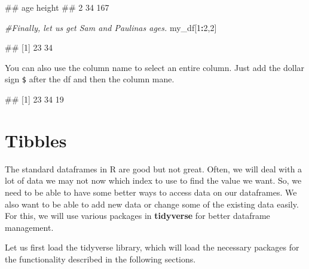 \documentclass[
]{book}
\newenvironment{Shaded}{\begin{snugshade}}{\end{snugshade}}
\newcommand{\CommentTok}[1]{\textcolor[rgb]{0.56,0.35,0.01}{\textit{#1}}}
\newcommand{\DecValTok}[1]{\textcolor[rgb]{0.00,0.00,0.81}{#1}}
\newcommand{\NormalTok}[1]{#1}
\newcommand{\SpecialCharTok}[1]{\textcolor[rgb]{0.81,0.36,0.00}{\textbf{#1}}}
\begin{document}
\begin{Shaded}
\begin{Highlighting}[]
\NormalTok{\#\#   age height}
\NormalTok{\#\# 2  34    167}
\end{Highlighting}
\end{Shaded}

\begin{Shaded}
\begin{Highlighting}[]
\CommentTok{\#Finally, let us get Sam and Paulina\textquotesingle{}s ages.}
\NormalTok{my\_df[}\DecValTok{1}\SpecialCharTok{:}\DecValTok{2}\NormalTok{,}\DecValTok{2}\NormalTok{]}
\end{Highlighting}
\end{Shaded}

\begin{Shaded}
\begin{Highlighting}[]
\NormalTok{\#\# [1] 23 34}
\end{Highlighting}
\end{Shaded}

You can also use the column name to select an entire column. Just add the dollar sign \texttt{\$} after the df and then the column mane.

\begin{Shaded}
\end{Shaded}

\begin{Shaded}
\begin{Highlighting}[]
\NormalTok{\#\# [1] 23 34 19}
\end{Highlighting}
\end{Shaded}

\hypertarget{tibbles}{%
\section{Tibbles}\label{tibbles}}

The standard dataframes in R are good but not great. Often, we will deal with a lot of data we may not now which index to use to find the value we want. So, we need to be able to have some better ways to access data on our dataframes. We also want to be able to add new data or change some of the existing data easily. For this, we will use various packages in \textbf{tidyverse} for better dataframe management.

Let us first load the tidyverse library, which will load the necessary packages for the functionality described in the following sections.
\end{document}
